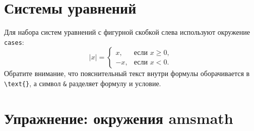 \section{Системы уравнений}
\par Для набора систем уравнений с фигурной скобкой слева используют окружение \verb"cases":
\[
    |x| = \begin{cases}
        x,  & \text{если } x \geqslant 0,\\
        -x, & \text{если } x < 0.
    \end{cases}
\]
Обратите внимание, что пояснительный текст внутри формулы оборачивается в \verb"\text{}", а символ \verb"&" разделяет формулу и условие.

\section{Упражнение: окружения amsmath}
